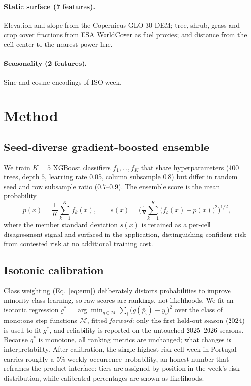 \documentclass[11pt]{article}
\begin{document}
\paragraph{Static surface (7 features).} Elevation and slope from the
Copernicus GLO-30 DEM; tree, shrub, grass and crop cover fractions from ESA
WorldCover as fuel proxies; and distance from the cell center to the nearest
power line.

\paragraph{Seasonality (2 features).} Sine and cosine encodings of ISO week.

\section{Method}
\label{sec:method}

\subsection{Seed-diverse gradient-boosted ensemble}

We train $K=5$ XGBoost classifiers $f_1,\dots,f_K$ that share hyperparameters
(400 trees, depth 6, learning rate 0.05, column subsample 0.8) but differ in
random seed and row subsample ratio ($0.7$--$0.9$). The ensemble score is the
mean probability
\begin{equation}
  \bar{p}(x) = \frac{1}{K}\sum_{k=1}^{K} f_k(x),
  \qquad
  s(x) = \Big(\tfrac{1}{K}\sum_{k=1}^{K}\big(f_k(x)-\bar{p}(x)\big)^2\Big)^{1/2},
\end{equation}
where the member standard deviation $s(x)$ is retained as a per-cell
disagreement signal and surfaced in the application, distinguishing confident
risk from contested risk at no additional training cost.

\subsection{Isotonic calibration}

Class weighting (Eq.~\ref{eq:erm}) deliberately distorts probabilities to
improve minority-class learning, so raw scores are rankings, not likelihoods.
We fit an isotonic regression \citep{zadrozny2002transforming}
$g^{*} = \arg\min_{g \in \mathcal{M}} \sum_i \big(g(\bar{p}_i) - y_i\big)^2$
over the class of monotone step functions $\mathcal{M}$, fitted
\emph{forward}: only the first held-out season (2024) is used to fit
$g^{*}$, and reliability is reported on the untouched 2025--2026 seasons. Because
$g^{*}$ is monotone, all ranking metrics are unchanged; what changes is
interpretability. After calibration, the single highest-risk cell-week in
Portugal carries roughly a 5\% weekly occurrence probability, an honest number
that reframes the product interface: tiers are assigned by position in the
week's risk distribution, while calibrated percentages are shown as
likelihoods.
\end{document}

